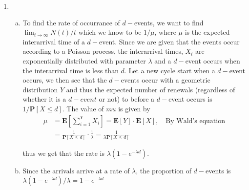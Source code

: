 \documentclass[a4paper,10pt]{article}
\theoremstyle{definition}
\begin{document}
\begin{enumerate}
\item
\begin{enumerate}[(a)]
\item To find the rate of occurrance of $d-$events, we want to find $\lim_{t\to\infty}N(t)/t$ which we know to be $1/\mu$, where $\mu$ is the expected interarrival time of a $d-$event. Since we are given that the events occur according to a Poisson process, the interarrival times, $X_i$ are exponentially distributed with parameter $\lambda$ and a $d-$event occurs when the interarrival time is less than $d$. Let a new cycle start when a $d-$event occurs, we then see that the $d-$events occur with a geometric distribution $Y$ and thus the expected number of renewals (regardless of whether it is a $d-event$ or not) to before a $d-$event occurs is $1/\mathbf{P}[X\leq d]$. The value of $mu$ is given by
\begin{align*}
\mu&=\mathbf{E}\left[\sum_{i=1}^{Y}X_i\right]=\mathbf{E}\left[Y\right]\cdot \mathbf{E}\left[X\right],\quad \text{By Wald's equation}\\
&=\frac{1}{\mathbf{P}[X\leq d]}\cdot \frac{1}{\lambda}=\frac{1}{\lambda\mathbf{P}[X\leq d]}
\end{align*}


thus we get that the rate is $\lambda(1- e^{-\lambda d})$.
\item Since the arrivals arrive at a rate of $\lambda$, the proportion of $d-$events is $\lambda(1-e^{-\lambda d})/\lambda=1-e^{-\lambda d}$
\end{enumerate}



\end{enumerate}
\end{document}

